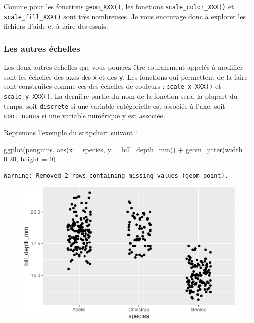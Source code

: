 \documentclass[
  letterpaper,
  DIV=11,
  numbers=noendperiod]{scrreprt}
\newenvironment{Shaded}{\begin{snugshade}}{\end{snugshade}}
\newcommand{\AttributeTok}[1]{\textcolor[rgb]{0.40,0.45,0.13}{#1}}
\newcommand{\DecValTok}[1]{\textcolor[rgb]{0.68,0.00,0.00}{#1}}
\newcommand{\FloatTok}[1]{\textcolor[rgb]{0.68,0.00,0.00}{#1}}
\newcommand{\FunctionTok}[1]{\textcolor[rgb]{0.28,0.35,0.67}{#1}}
\newcommand{\NormalTok}[1]{\textcolor[rgb]{0.00,0.23,0.31}{#1}}
\newcommand{\SpecialCharTok}[1]{\textcolor[rgb]{0.37,0.37,0.37}{#1}}
\begin{document}
Comme pour les fonctions \texttt{geom\_XXX()}, les fonctions
\texttt{scale\_color\_XXX()} et \texttt{scale\_fill\_XXX()} sont très
nombreuses. Je vous encourage donc à explorer les fichiers d'aide et à
faire des essais.

\hypertarget{les-autres-uxe9chelles}{%
\subsubsection{Les autres échelles}\label{les-autres-uxe9chelles}}

Les deux autres échelles que vous pourrez être couramment appelés à
modifier sont les échelles des axes des \texttt{x} et des \texttt{y}.
Les fonctions qui permettent de la faire sont construites comme ces des
échelles de couleurs : \texttt{scale\_x\_XXX()} et
\texttt{scale\_y\_XXX()}. La dernière partie du nom de la fonction sera,
la plupart du temps, soit \texttt{discrete} si une variable catégorielle
est associée à l'axe, soit \texttt{continuous} si une variable numérique
y est associée.

Reprenons l'exemple du stripchart suivant :

\begin{Shaded}
\begin{Highlighting}[]
\FunctionTok{ggplot}\NormalTok{(penguins, }\FunctionTok{aes}\NormalTok{(}\AttributeTok{x =}\NormalTok{ species, }\AttributeTok{y =}\NormalTok{ bill\_depth\_mm)) }\SpecialCharTok{+}
  \FunctionTok{geom\_jitter}\NormalTok{(}\AttributeTok{width =} \FloatTok{0.20}\NormalTok{, }\AttributeTok{height =} \DecValTok{0}\NormalTok{)}
\end{Highlighting}
\end{Shaded}

\begin{verbatim}
Warning: Removed 2 rows containing missing values (geom_point).
\end{verbatim}

\begin{figure}[H]

{\centering \includegraphics{./03-visualization_files/figure-pdf/unnamed-chunk-103-1.png}

}

\end{figure}
\end{document}
